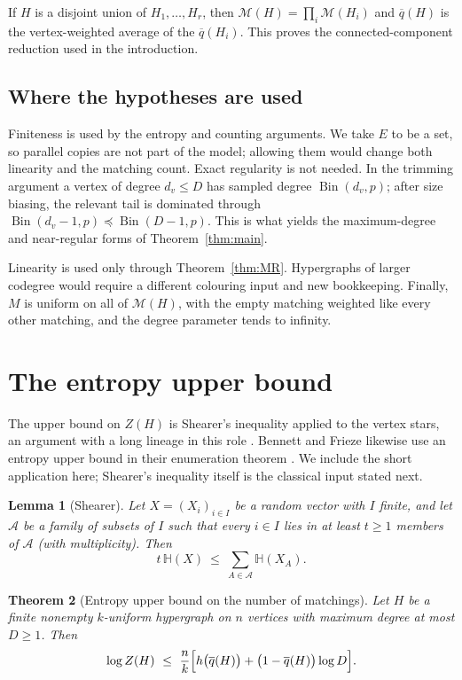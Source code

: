 \documentclass[11pt,a4paper]{amsart}
\theoremstyle{plain}
\newtheorem{theorem}{Theorem}[section]
\newtheorem{lemma}[theorem]{Lemma}
\theoremstyle{definition}
\theoremstyle{remark}
\newcommand{\EE}{E}
\newcommand{\Mat}{\mathcal{M}}
\newcommand{\Ent}{\mathbb{H}}
\newcommand{\qbar}{\overline{q}}
\newcommand{\Bin}{\operatorname{Bin}}
\begin{document}
If $H$ is a disjoint union of $H_1,\ldots,H_r$, then
$\Mat(H)=\prod_i\Mat(H_i)$ and $\qbar(H)$ is the vertex-weighted average of the
$\qbar(H_i)$. This proves the connected-component reduction used in the introduction.

\subsection{Where the hypotheses are used}
\label{subsec:hypotheses}

Finiteness is used by the entropy and counting arguments. We take $\EE$ to be a set, so
parallel copies are not part of the model; allowing them would change both linearity and
the matching count. Exact regularity is not needed. In the trimming argument a vertex of
degree $d_v\le D$ has sampled degree $\Bin(d_v,p)$; after size biasing, the relevant tail is
dominated through $\Bin(d_v-1,p)\preceq\Bin(D-1,p)$. This is what yields the
maximum-degree and near-regular forms of Theorem~\ref{thm:main}.

Linearity is used only through Theorem~\ref{thm:MR}. Hypergraphs of larger codegree would
require a different colouring input and new bookkeeping. Finally, $M$ is uniform on all
of $\Mat(H)$, with the empty matching weighted like every other matching, and the degree
parameter tends to infinity.

\section{The entropy upper bound}
\label{sec:shearer}

The upper bound on $Z(H)$ is Shearer's inequality applied to the vertex stars, an argument
with a long lineage in this role \cite{Shearer,Radhakrishnan,LinialLuria}. Bennett and
Frieze likewise use an entropy upper bound in their enumeration theorem
\cite{BennettFrieze}. We include the short application here; Shearer's inequality itself
is the classical input stated next.

\begin{lemma}[Shearer]
\label{lem:shearer}
Let $X=(X_i)_{i\in I}$ be a random vector with $I$ finite, and let $\mathcal{A}$ be a
family of subsets of $I$ such that every $i\in I$ lies in at least $t\ge 1$ members of
$\mathcal{A}$ (with multiplicity). Then
\[
  t\,\Ent(X)\ \le\ \sum_{A\in\mathcal{A}}\Ent(X_A).
\]
\end{lemma}

\begin{theorem}[Entropy upper bound on the number of matchings]
\label{thm:shearer}
Let $H$ be a finite nonempty $k$-uniform hypergraph on $n$ vertices with maximum degree
at most $D\ge1$.
Then
\[
  \log Z(H)\ \le\ \frac{n}{k}\Bigl[h\bigl(\qbar(H)\bigr)+\bigl(1-\qbar(H)\bigr)\log D\Bigr].
\]
\end{theorem}
\end{document}
